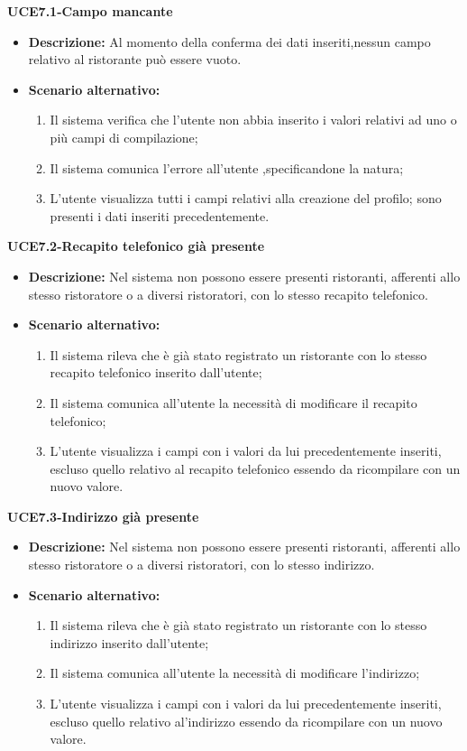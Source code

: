 \pagebreak

\textbf{UCE7.1-Campo mancante}
\begin{itemize}
    \item \textbf{Descrizione: }Al momento della conferma dei dati inseriti,nessun campo relativo al ristorante può essere vuoto.
    \item \textbf{Scenario alternativo:}
    \begin{enumerate}
        \item Il sistema verifica che l'utente non abbia inserito i valori relativi ad uno o più campi di
        compilazione;
        \item Il sistema comunica l'errore all'utente ,specificandone la natura;
        \item L'utente visualizza tutti i campi relativi alla creazione del profilo; sono presenti i dati inseriti precedentemente.
    \end{enumerate}
\end{itemize}

\textbf{UCE7.2-Recapito telefonico già presente}
\begin{itemize}
    \item \textbf{Descrizione: }Nel sistema non possono essere presenti ristoranti, afferenti allo stesso ristoratore
    o a diversi ristoratori, con lo stesso recapito telefonico.
    \item \textbf{Scenario alternativo:}
    \begin{enumerate}
        \item Il sistema rileva che è già stato registrato un ristorante con lo stesso recapito telefonico
        inserito dall'utente;
        \item Il sistema comunica all'utente la necessità di modificare il recapito telefonico;
        \item L'utente visualizza i campi con i valori da lui precedentemente inseriti, escluso quello relativo al recapito telefonico
        essendo da ricompilare con un nuovo valore.
    \end{enumerate}
\end{itemize}

\textbf{UCE7.3-Indirizzo già presente}
\begin{itemize}
    \item \textbf{Descrizione: }Nel sistema non possono essere presenti ristoranti, afferenti allo stesso ristoratore
    o a diversi ristoratori, con lo stesso indirizzo.
    \item \textbf{Scenario alternativo:}
    \begin{enumerate}
        \item Il sistema rileva che è già stato registrato un ristorante con lo stesso indirizzo
        inserito dall'utente;
        \item Il sistema comunica all'utente la necessità di modificare l'indirizzo;
        \item L'utente visualizza i campi con i valori da lui precedentemente inseriti, escluso quello relativo al'indirizzo
        essendo da ricompilare con un nuovo valore.
    \end{enumerate}
\end{itemize}

